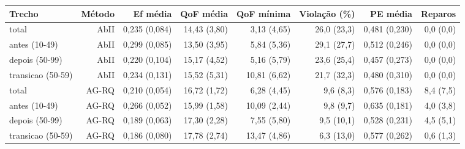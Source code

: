 \begin{tabular}{lrrrrrrr}
\toprule
Trecho & Método & Ef média & QoF média & QoF mínima & Violação (\%) & PE média & Reparos \\
\midrule
total & AbII & 0{,}235 (0{,}084) & 14{,}43 (3{,}80) & 3{,}13 (4{,}65) & 26{,}0 (23{,}3) & 0{,}481 (0{,}230) & 0{,}0 (0{,}0) \\
antes (10-49) & AbII & 0{,}299 (0{,}085) & 13{,}50 (3{,}95) & 5{,}84 (5{,}36) & 29{,}1 (27{,}7) & 0{,}512 (0{,}246) & 0{,}0 (0{,}0) \\
depois (50-99) & AbII & 0{,}220 (0{,}104) & 15{,}17 (4{,}52) & 5{,}16 (5{,}79) & 23{,}6 (25{,}4) & 0{,}457 (0{,}273) & 0{,}0 (0{,}0) \\
transicao (50-59) & AbII & 0{,}234 (0{,}131) & 15{,}52 (5{,}31) & 10{,}81 (6{,}62) & 21{,}7 (32{,}3) & 0{,}480 (0{,}310) & 0{,}0 (0{,}0) \\
total & AG-RQ & 0{,}210 (0{,}054) & 16{,}72 (1{,}72) & 6{,}28 (4{,}45) & 9{,}6 (8{,}3) & 0{,}576 (0{,}183) & 8{,}4 (7{,}5) \\
antes (10-49) & AG-RQ & 0{,}266 (0{,}052) & 15{,}99 (1{,}58) & 10{,}09 (2{,}44) & 9{,}8 (9{,}7) & 0{,}635 (0{,}181) & 4{,}0 (3{,}8) \\
depois (50-99) & AG-RQ & 0{,}189 (0{,}063) & 17{,}30 (2{,}28) & 7{,}55 (5{,}80) & 9{,}5 (10{,}1) & 0{,}528 (0{,}231) & 4{,}5 (5{,}1) \\
transicao (50-59) & AG-RQ & 0{,}186 (0{,}080) & 17{,}78 (2{,}74) & 13{,}47 (4{,}86) & 6{,}3 (13{,}0) & 0{,}577 (0{,}262) & 0{,}6 (1{,}3) \\
\bottomrule
\end{tabular}
